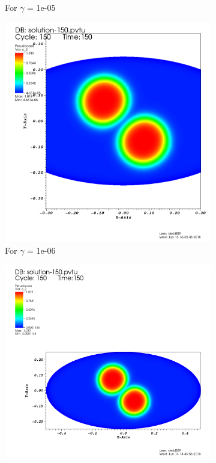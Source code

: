 \documentclass[idxtotoc,hyperref,openany]{labbook} %
\begin{document}
\begin{figure}[h!]
\begin{subfigure}[h!]{0.4\textwidth}
		\caption{For $\gamma$ = 1e-05}
		\label{fig:1e_05.png}
	\end{subfigure}
	\begin{subfigure}[h!]{0.4\textwidth}
		\includegraphics[width=\textwidth]{1e_06.png}
		\caption{For $\gamma$ = 1e-06}
		\label{fig:1e_06.png}
	\end{subfigure}
	\begin{subfigure}[h!]{0.4\textwidth}
		\includegraphics[width=\textwidth]{4e_04.png}

\end{subfigure}
\end{figure}
\end{document}
